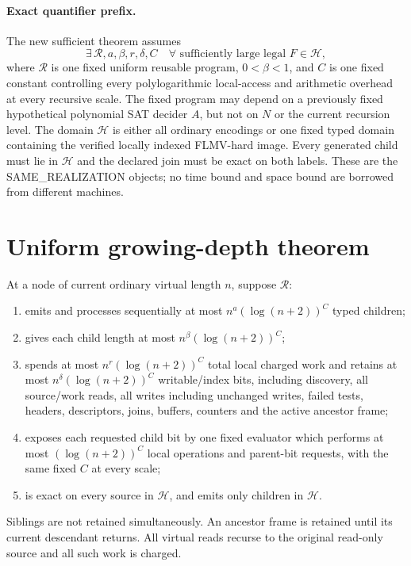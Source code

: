 \documentclass[11pt]{article}
\begin{document}
\paragraph{Exact quantifier prefix.}
The new sufficient theorem assumes
\[
 \exists\,\mathcal R,a,\beta,r,\delta,C\quad
 \forall\text{ sufficiently large legal }F\in\mathcal H,
\]
where $\mathcal R$ is one fixed uniform reusable program, $0<\beta<1$, and
$C$ is one fixed constant controlling every polylogarithmic local-access and
arithmetic overhead at every recursive scale.  The fixed program may depend
on a previously fixed hypothetical polynomial SAT decider $A$, but not on
$N$ or the current recursion level.  The domain $\mathcal H$ is either all
ordinary encodings or one fixed typed domain containing the verified
locally indexed FLMV-hard image.  Every generated child must lie in
$\mathcal H$ and the declared join must be exact on both labels.  These are
the SAME\_REALIZATION objects; no time bound and space bound are borrowed
from different machines.

\section{Uniform growing-depth theorem}
At a node of current ordinary virtual length $n$, suppose $\mathcal R$:
\begin{enumerate}
\item emits and processes sequentially at most
$n^{a}(\log(n+2))^C$ typed children;
\item gives each child length at most
$n^\beta(\log(n+2))^C$;
\item spends at most $n^r(\log(n+2))^C$ total local charged work and retains
at most $n^\delta(\log(n+2))^C$ writable/index bits, including discovery,
all source/work reads, all writes including unchanged writes, failed tests,
headers, descriptors, joins, buffers, counters and the active ancestor frame;
\item exposes each requested child bit by one fixed evaluator which performs
at most $(\log(n+2))^C$ local operations and parent-bit requests, with the
same fixed $C$ at every scale;
\item is exact on every source in $\mathcal H$, and emits only children in
$\mathcal H$.
\end{enumerate}
Siblings are not retained simultaneously.  An ancestor frame is retained
until its current descendant returns.  All virtual reads recurse to the
original read-only source and all such work is charged.
\end{document}
